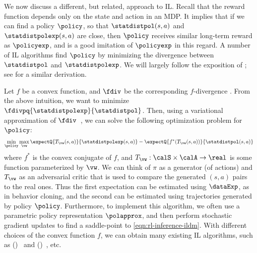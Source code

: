 We now discuss a different, but related, approach to IL.
Recall that the reward function depends only on
the state and action in an MDP.
It implies that if we can find a policy $\policy$,
so that $\statdistpol(s,a)$ and $\statdistpolexp(s,a)$ are close,
then $\policy$ receives similar long-term reward
as $\policyexp$,
and is a good imitation of $\policyexp$ in this regard.
A number of IL algorithms find $\policy$
by minimizing the divergence between
$\statdistpol$ and $\statdistpolexp$.
We will largely follow the exposition of \citep{Ghasemipour19};
see \citep{Ke19} for a similar derivation.

Let $f$ be a convex function,
and $\fdiv$ be the corresponding $f$-divergence
\citep{Morimoto1963,Ali1966,Csiszar1967,liese2006divergences,csiszar2004information}.
From the above intuition, we want to minimize
$\fdivpq{\statdistpolexp}{\statdistpol}$.
Then, using a variational approximation of
$\fdiv$~\citep{Nguyen2010},
we can solve the following optimization problem for $\policy$:
\begin{align}
\label{eqn:rl-inference-ildm}
\min_{\policy} \max_{\vw}
\expectQ{T_{\vw}(s,a)}{\statdistpolexp(s,a)}
- \expectQ{f^*(T_{\vw}(s,a))}{\statdistpol(s,a)}
\end{align}
where $f^*$ is the convex conjugate of $f$,
and $T_{\vw}:\calS\times\calA\to\real$
is some function parameterized by $\vw$.
We can think of $\pi$ as a generator (of actions)
and $T_{\vw}$ as an adversarial critic
that is used to compare the generated $(s,a)$
pairs to the real ones.
Thus
the first expectation can be estimated using
$\dataExp$, as in behavior cloning,
and the second can be estimated using trajectories
generated by policy $\policy$.
Furthermore, to implement this algorithm, we often
use a parametric policy representation $\polapprox$,
and then perform stochastic gradient updates to
find a saddle-point to \cref{eqn:rl-inference-ildm}.
%
With different choices of the convex function $f$,
we can obtain many existing IL algorithms,
such as 
()~\citep{Ho16}
and
()~\citep{Fu18},
etc.


